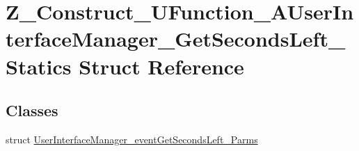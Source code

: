 \hypertarget{struct_z___construct___u_function___a_user_interface_manager___get_seconds_left___statics}{}\section{Z\+\_\+\+Construct\+\_\+\+U\+Function\+\_\+\+A\+User\+Interface\+Manager\+\_\+\+Get\+Seconds\+Left\+\_\+\+Statics Struct Reference}
\label{struct_z___construct___u_function___a_user_interface_manager___get_seconds_left___statics}
\subsection*{Classes}
\begin{DoxyCompactItemize}
\item 
struct \mbox{\hyperlink{struct_z___construct___u_function___a_user_interface_manager___get_seconds_left___statics_1_1_usb72e3e8755be6fd85ca6813b22c3485d}{User\+Interface\+Manager\+\_\+event\+Get\+Seconds\+Left\+\_\+\+Parms}}
\end{DoxyCompactItemize}
